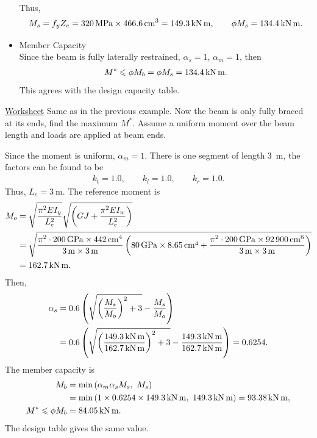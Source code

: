 \begin{solution}
\begin{itemize}
\begin{align*}
\end{align*}
Thus,
\begin{gather*}
M_s=f_yZ_e=\SI{320}{\mega\pascal}\times\SI{466.6}{\centi\meter^3}=\SI{149.3}{\kilo\newton\meter},\qquad\phi{}M_s=\SI{134.4}{\kilo\newton\meter}.
\end{gather*}
\item Member Capacity\\
Since the beam is fully laterally restrained, $\alpha_s=1$, $\alpha_m=1$, then
\begin{gather*}
M^*\leqslant\phi{}M_b=\phi{}M_s=\SI{134.4}{\kilo\newton\meter}.
\end{gather*}
This agrees with the design capacity table.
\end{itemize}
\end{solution}

\begin{exmp}\href{run:./WORKSHEET/CH05/EX5.BSSB.sm}{Worksheet}
Same as in the previous example. Now the beam is only fully braced at its ends, find the maximum $M^*$. Assume a uniform moment over the beam length and loads are applied at beam ends.
\end{exmp}
\begin{solution}
Since the moment is uniform, $\alpha_m=1$. There is one segment of length \SI{3}{\meter}, the factors can be found to be
\begin{gather*}
k_t=1.0,\qquad
k_l=1.0,\qquad
k_r=1.0.
\end{gather*}
Thus, $L_e=\SI{3}{\meter}$. The reference moment is
\begin{align*}
M_o&=\sqrt{\dfrac{\pi^2EI_y}{L_e^2}}\sqrt{\left(GJ+\dfrac{\pi^2EI_w}{L_e^2}\right)}\\&=\sqrt{\dfrac{\pi^2\cdot\SI{200}{\giga\pascal}\times\SI{442}{\centi\meter^4}}{\SI{3}{\meter}\times\SI{3}{\meter}}\left(\SI{80}{\giga\pascal}\times\SI{8.65}{\centi\meter^4}+\dfrac{\pi^2\cdot\SI{200}{\giga\pascal}\times\SI{92900}{\centi\meter^6}}{\SI{3}{\meter}\times\SI{3}{\meter}}\right)}\\&=\SI{162.7}{\kilo\newton\meter}.
\end{align*}
Then,
\begin{align*}
\alpha_s&=0.6\left(\sqrt{\left(\dfrac{M_s}{M_o}\right)^2+3}-\dfrac{M_s}{M_o}\right)\\&=0.6\left(\sqrt{\left(\dfrac{\SI{149.3}{\kilo\newton\meter}}{\SI{162.7}{\kilo\newton\meter}}\right)^2+3}-\dfrac{\SI{149.3}{\kilo\newton\meter}}{\SI{162.7}{\kilo\newton\meter}}\right)=0.6254.
\end{align*}
The member capacity is
\begin{align*}
M_b&=\min\left(\alpha_m\alpha_sM_s,~M_s\right)\\&=\min\left(1\times0.6254\times\SI{149.3}{\kilo\newton\meter},~\SI{149.3}{\kilo\newton\meter}\right)=\SI{93.38}{\kilo\newton\meter},\\M^*\leqslant\phi{}M_b&=\SI{84.05}{\kilo\newton\meter}.
\end{align*}
The design table gives the same value.
\end{solution}


